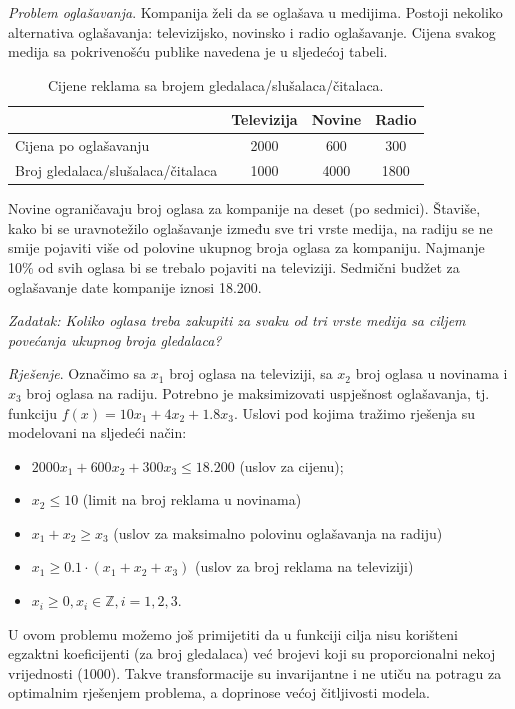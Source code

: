 \documentclass[a4paper, utf8, 11pt, colorlinks]{book}
\begin{document}
\emph{Problem oglašavanja}. Kompanija želi da se oglašava u medijima. Postoji nekoliko alternativa oglašavanja:  televizijsko, novinsko i radio oglašavanje. Cijena svakog medija sa pokrivenošću publike navedena je u sljedećoj tabeli.

\begin{table}[!ht]
	\centering
	\begin{tabular}{l|c|c|c} \hline
		\                  & Televizija & Novine & Radio  \\ \hline
		Cijena po oglašavanju      & 2000       & 600    & 300    \\
		Broj gledalaca/slušalaca/čitalaca      & 1000      & 4000  & 1800 \\ \hline
	\end{tabular}
	\caption{Cijene reklama sa brojem gledalaca/slušalaca/čitalaca.}
	\label{tab:tab_model_advertising}
\end{table}

Novine ograničavaju broj oglasa za kompanije na deset (po sedmici). Štaviše, kako bi se uravnotežilo oglašavanje između sve tri vrste medija, na radiju se ne smije pojaviti više od polovine ukupnog broja oglasa za kompaniju. Najmanje 10\% od svih oglasa bi se trebalo pojaviti na televiziji. Sedmični budžet za oglašavanje date kompanije iznosi 18.200. 

\emph{Zadatak: Koliko oglasa treba zakupiti za svaku od tri vrste medija sa ciljem povećanja ukupnog broja gledalaca?}

\emph{Rješenje}.   Označimo sa $x_1$ broj oglasa na televiziji, sa $x_2$ broj oglasa u novinama i $x_3$ broj oglasa na radiju. Potrebno je maksimizovati   uspješnost oglašavanja, tj. funkciju 
$f(x) = 10 x_1 + 4 x_2 + 1.8 x_3.$ Uslovi pod kojima tražimo rješenja su modelovani na sljedeći način:
\begin{itemize}
	\item $2000 x_1 + 600 x_2 + 300 x_3 \leq 18.200$ (uslov za cijenu);
	\item  $ x_2 \leq 10$ (limit na broj reklama u novinama)
	\item $x_1 + x_2 \geq x_3$ (uslov za maksimalno polovinu oglašavanja na radiju) 
	\item ${x_1}\geq 0.1\cdot (x_1 + x_2 + x_3)$ (uslov za broj reklama na televiziji)
	\item $x_i \geq 0, x_i \in \mathbb{Z}, i=1,2,3$.
\end{itemize}

U ovom problemu možemo još primijetiti da u funkciji cilja   
nisu korišteni egzaktni koeficijenti (za broj gledalaca) već brojevi koji su proporcionalni nekoj vrijednosti (1000). Takve transformacije su invarijantne i ne utiču na potragu za optimalnim rješenjem  problema, a doprinose većoj čitljivosti modela.
\end{document}
